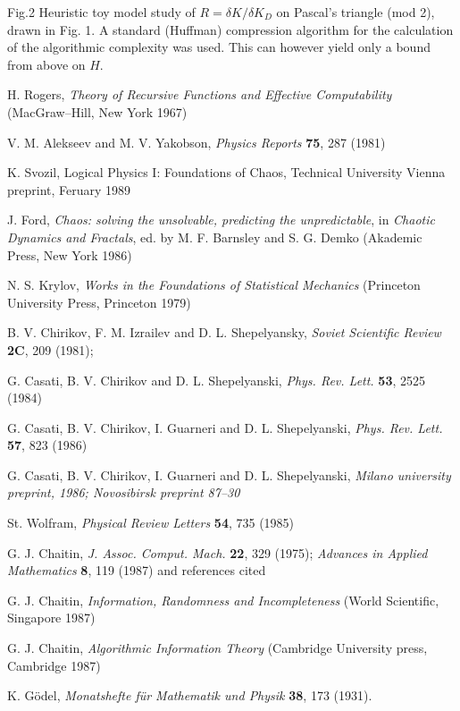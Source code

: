 {\sc Fig.2} {Heuristic toy model study of  $R=\delta K/\delta K_D$
on Pascal's triangle (mod 2), drawn in Fig. 1.
A standard (Huffman) compression algorithm for the calculation of the
algorithmic
complexity was used. This can however yield only a bound from above on
$H$.}
\begin{thebibliography}{999}

H. Rogers, {\sl Theory of Recursive Functions and Effective
Computability} (MacGraw--Hill, New York 1967)

V. M. Alekseev and M. V. Yakobson, {\sl Physics Reports}
{\bf 75}, 287 (1981)

K. Svozil, {Logical Physics I: Foundations of Chaos},
Technical University Vienna preprint, Feruary 1989

J. Ford, {\sl Chaos: solving the unsolvable, predicting the
unpredictable}, in {\sl Chaotic Dynamics and Fractals}, ed. by M. F.
Barnsley and S. G. Demko (Akademic Press, New York 1986)

N. S. Krylov, {\sl Works in the Foundations of Statistical
Mechanics}
(Princeton University Press, Princeton 1979)

B. V. Chirikov, F. M. Izrailev and D. L. Shepelyansky,
{\sl Soviet Scientific Review} {\bf 2C}, 209 (1981);

G. Casati, B. V. Chirikov and D. L. Shepelyanski,
{\sl Phys. Rev. Lett.} {\bf 53}, 2525 (1984)

G. Casati, B. V. Chirikov, I. Guarneri and D. L. Shepelyanski,
{\sl Phys. Rev. Lett.} {\bf 57}, 823 (1986)

G. Casati, B. V. Chirikov, I. Guarneri and D. L. Shepelyanski,
{\sl Milano university preprint, 1986;
Novosibirsk preprint 87--30}

St. Wolfram, {\sl Physical Review Letters} {\bf 54}, 735 (1985)

G. J. Chaitin, {\sl J. Assoc. Comput. Mach.}  {\bf 22},
329 (1975);
{\sl Advances in Applied
Mathematics}  {\bf 8}, 119 (1987) and references cited

G. J. Chaitin, {\sl Information, Randomness and Incompleteness}
(World Scientific, Singapore 1987)

G. J. Chaitin, {\sl Algorithmic Information Theory}
(Cambridge University press, Cambridge 1987)

K. G\"odel, {\sl Monatshefte f\"ur Mathematik und Physik}
{\bf 38}, 173 (1931).


\end{thebibliography}
